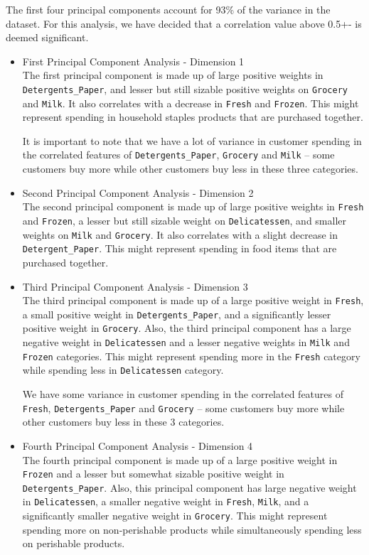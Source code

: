 \documentclass[twoside,openright,titlepage,numbers=noenddot,headinclude,%
               footinclude=true,cleardoublepage=empty,abstractoff,BCOR=5mm,%
               paper=a4,fontsize=11pt,ngerman,american]{scrreprt}
\numberwithin{theorem}{chapter}
\numberwithin{definition}{chapter}
\numberwithin{algorithm}{chapter}
\numberwithin{figure}{chapter}
\numberwithin{table}{chapter}
\numberwithin{equation}{chapter}
\begin{document}
The first four principal components account for 93\% of the variance in the dataset. For this analysis, we have decided that a correlation value above 0.5+- is deemed significant. 

\begin{itemize}

\item First Principal Component Analysis - Dimension 1 \\
The first principal component is made up of large positive weights in \texttt{Detergents\_Paper}, and lesser but still sizable positive weights on \texttt{Grocery} and \texttt{Milk}. It also correlates with a decrease in \texttt{Fresh} and \texttt{Frozen}. This might represent spending in household staples products that are purchased together. 

It is important to note that we have a lot of variance in customer spending in the correlated features of \texttt{Detergents\_Paper}, \texttt{Grocery} and \texttt{Milk} -- some customers buy more while other customers buy less in these three categories.

\item Second Principal Component Analysis - Dimension 2\\
The second principal component is made up of large positive weights in \texttt{Fresh} and \texttt{Frozen}, a lesser but still sizable weight on \texttt{Delicatessen}, and smaller weights on \texttt{Milk} and \texttt{Grocery}. It also correlates with a slight decrease in \texttt{Detergent\_Paper}. This might represent spending in food items that are purchased together.

\item Third Principal Component Analysis - Dimension 3\\
The third principal component is made up of a large positive weight in \texttt{Fresh}, a small positive weight in \texttt{Detergents\_Paper}, and a significantly lesser positive weight in \texttt{Grocery}. Also, the third principal component has a large negative weight in \texttt{Delicatessen} and a lesser negative weights in \texttt{Milk} and \texttt{Frozen} categories. This might represent spending more in the \texttt{Fresh} category while spending less in \texttt{Delicatessen} category.

We have some variance in customer spending in the correlated features of \texttt{Fresh}, \texttt{Detergents\_Paper} and \texttt{Grocery} -- some customers buy more while other customers buy less in these 3 categories.


\item Fourth Principal Component Analysis - Dimension 4\\
The fourth principal component is made up of a large positive weight in \texttt{Frozen} and a lesser but somewhat sizable positive weight in \texttt{Detergents\_Paper}. Also, this principal component has large negative weight in \texttt{Delicatessen}, a smaller negative weight in \texttt{Fresh}, \texttt{Milk}, and a significantly smaller negative weight in \texttt{Grocery}. This might represent spending more on non-perishable products while simultaneously spending less on perishable products.
\end{itemize}
\end{document}
